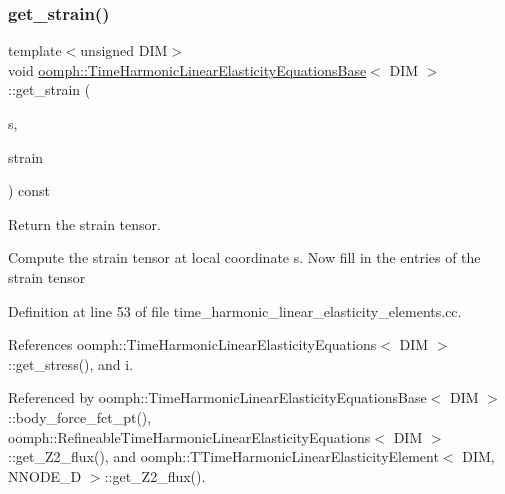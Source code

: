 \subsubsection{\texorpdfstring{get\+\_\+strain()}{get\_strain()}}
{\footnotesize\ttfamily template$<$unsigned D\+IM$>$ \\
void \hyperlink{classoomph_1_1TimeHarmonicLinearElasticityEquationsBase}{oomph\+::\+Time\+Harmonic\+Linear\+Elasticity\+Equations\+Base}$<$ D\+IM $>$\+::get\+\_\+strain (\begin{DoxyParamCaption}\item[{const \hyperlink{classoomph_1_1Vector}{Vector}$<$ double $>$ \&}]{s,  }\item[{\hyperlink{classoomph_1_1DenseMatrix}{Dense\+Matrix}$<$ std\+::complex$<$ double $>$ $>$ \&}]{strain }\end{DoxyParamCaption}) const}



Return the strain tensor. 

Compute the strain tensor at local coordinate s. Now fill in the entries of the strain tensor 

Definition at line 53 of file time\+\_\+harmonic\+\_\+linear\+\_\+elasticity\+\_\+elements.\+cc.



References oomph\+::\+Time\+Harmonic\+Linear\+Elasticity\+Equations$<$ D\+I\+M $>$\+::get\+\_\+stress(), and i.



Referenced by oomph\+::\+Time\+Harmonic\+Linear\+Elasticity\+Equations\+Base$<$ D\+I\+M $>$\+::body\+\_\+force\+\_\+fct\+\_\+pt(), oomph\+::\+Refineable\+Time\+Harmonic\+Linear\+Elasticity\+Equations$<$ D\+I\+M $>$\+::get\+\_\+\+Z2\+\_\+flux(), and oomph\+::\+T\+Time\+Harmonic\+Linear\+Elasticity\+Element$<$ D\+I\+M, N\+N\+O\+D\+E\+\_\+D $>$\+::get\+\_\+\+Z2\+\_\+flux().

\mbox{\label{classoomph_1_1TimeHarmonicLinearElasticityEquationsBase_a292db17379dfd457f5cc103acc3c5163}} 
